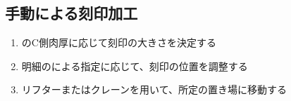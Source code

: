 \subsection{手動による刻印加工}
\begin{enumerate}[label=\sarrow]
\item {}\nameBottomEndFace のC側肉厚に応じて刻印の大きさを決定する
\item {}明細のによる指定に応じて、刻印の位置を調整する
\item {}リフターまたはクレーンを用いて、所定の置き場に移動する
\end{enumerate}


